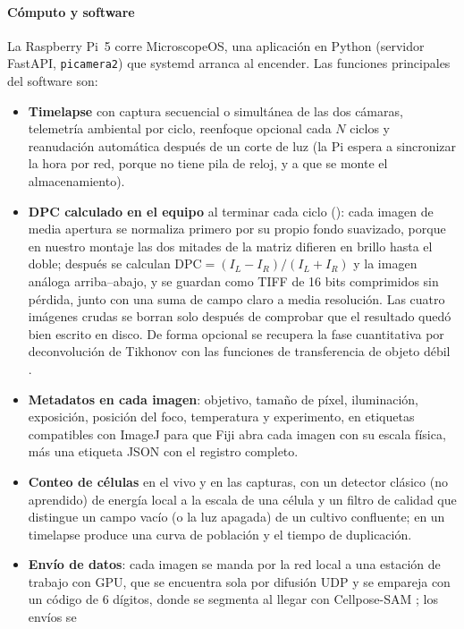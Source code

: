 \documentclass[preprint,12pt]{elsarticle}
\begin{document}
\paragraph{Cómputo y software} La Raspberry Pi~5 corre MicroscopeOS, una
aplicación en Python (servidor FastAPI, \texttt{picamera2}) que systemd
arranca al encender. Las funciones principales del software son:
\begin{itemize}
\item \textbf{Timelapse} con captura secuencial o simultánea de las dos
  cámaras, telemetría ambiental por ciclo, reenfoque opcional cada $N$
  ciclos y reanudación automática después de un corte de luz (la Pi espera
  a sincronizar la hora por red, porque no tiene pila de reloj, y a que se
  monte el almacenamiento).
\item \textbf{DPC calculado en el equipo} al terminar cada ciclo
  (): cada imagen de media apertura se normaliza primero
  por su propio fondo suavizado, porque en nuestro montaje las dos mitades
  de la matriz difieren en brillo hasta el doble; después se calculan
  $\mathrm{DPC} = (I_L - I_R)/(I_L + I_R)$ y la imagen análoga
  arriba--abajo, y se guardan como TIFF de 16 bits comprimidos sin pérdida,
  junto con una suma de campo claro a media resolución. Las cuatro
  imágenes crudas se borran solo después de comprobar que el resultado
  quedó bien escrito en disco. De forma opcional se recupera la fase
  cuantitativa por deconvolución de Tikhonov con las funciones de
  transferencia de objeto débil \cite{Tian2015DPC}.
\item \textbf{Metadatos en cada imagen}: objetivo, tamaño de píxel,
  iluminación, exposición, posición del foco, temperatura y experimento,
  en etiquetas compatibles con ImageJ para que Fiji \cite{Ref079} abra cada
  imagen con su escala física, más una etiqueta JSON con el registro
  completo.
\item \textbf{Conteo de células} en el vivo y en las capturas, con un
  detector clásico (no aprendido) de energía local a la escala de una
  célula y un filtro de calidad que distingue un campo vacío (o la luz
  apagada) de un cultivo confluente; en un timelapse produce una curva de
  población y el tiempo de duplicación.
\item \textbf{Envío de datos}: cada imagen se manda por la red local a una
  estación de trabajo con GPU, que se encuentra sola por difusión UDP y se
  empareja con un código de 6 dígitos, donde se segmenta al llegar con
  Cellpose-SAM \cite{Ref068,Pachitariu2025CellposeSAM}; los envíos se

\end{itemize}
\end{document}
